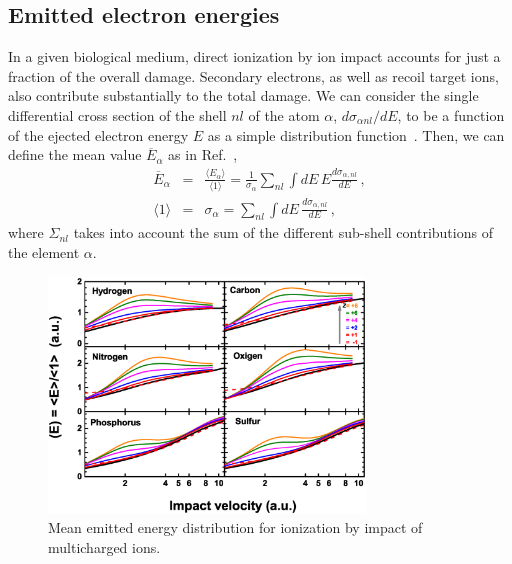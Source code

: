 \documentclass[preprint,12pt]{article}
\begin{document}
\subsection{Emitted electron energies}

In a given biological medium, direct ionization by ion impact accounts 
for just a fraction of the overall damage. Secondary electrons, as well 
as recoil target ions, also contribute substantially to the total damage. 
We can consider the single differential cross section of the shell 
$nl$ of the atom $\alpha$, $d\sigma _{\alpha nl}/dE$, to be a function 
of the ejected electron energy $E$ as a simple distribution 
function~\cite{surdutovic2018}. Then, we can define the mean value 
$\overline{E}_{\alpha}$ as in Ref.~\cite{abril2015},
\begin{eqnarray}
\overline{E}_{\alpha} &=&\frac{\langle E_{\alpha}\rangle}{\langle
1\rangle}=\frac{1}{\sigma_{\alpha}}\sum\limits_{nl}\int dE\,E
\frac{d\sigma_{\alpha,nl}}{dE}\,,  
\label{40} \\
\langle 1\rangle &=&\sigma_{\alpha}=\sum\limits_{nl}\int dE\,
\frac{d\sigma_{\alpha,nl}}{dE}\,,  
\label{50}
\end{eqnarray}
where $\Sigma_{nl}$ takes into account the sum of the different 
sub-shell contributions of the element $\alpha$.

\begin{figure}[t!]
\centering
\includegraphics[width=0.75\textwidth]{figuras/Fig_finales/Fig5.eps}
\caption{Mean emitted energy distribution for ionization by impact of
multicharged ions.}
\label{fig:emittedener}
\end{figure} 
\end{document}
